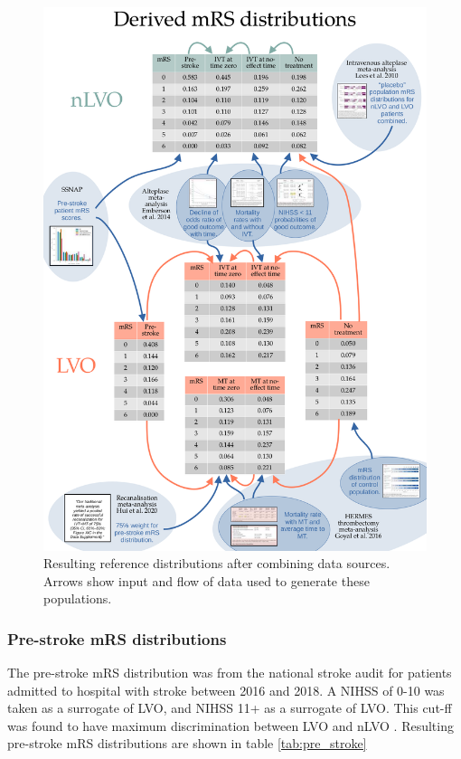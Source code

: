\begin{figure}[h!]
    \centering
    \includegraphics[width=1.0\linewidth]{images_modelling/data_sources_summary.png}
    \caption{Resulting reference distributions after combining data sources. Arrows show input and flow of data used to generate these populations.}
    \label{fig:data_sources_summary}
\end{figure}

\subsubsection{Pre-stroke mRS distributions}

The pre-stroke mRS distribution was from the national stroke audit for patients admitted to hospital with stroke between 2016 and 2018. A NIHSS of 0-10 was taken as a surrogate of LVO, and NIHSS 11+ as a surrogate of LVO. This cut-ff was found to have maximum discrimination between LVO and nLVO \cite{perez_de_la_ossa_effect_2022}. Resulting pre-stroke mRS distributions are shown in table \ref{tab:pre_stroke}

